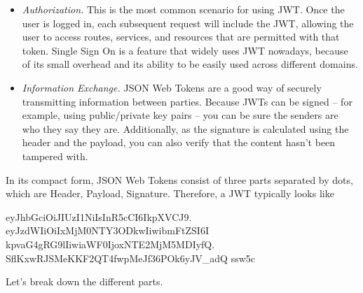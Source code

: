 \begin{itemize}
    \item \textit{Authorization.} This is the most common scenario for using JWT. Once the user is logged in, each
    subsequent request will include the JWT, allowing the user to access routes, services, and resources that are permitted
    with that token.
    Single Sign On is a feature that widely uses JWT nowadays, because of its small overhead and its ability to be easily
    used across different domains.
    \item \textit{Information Exchange.} JSON Web Tokens are a good way of securely transmitting information between
    parties.
    Because JWTs can be signed -- for example, using public/private key pairs -- you can be sure the senders are who they
    say they are.
    Additionally, as the signature is calculated using the header and the payload, you can also verify that the content
    hasn't been tampered with.
\end{itemize}
In its compact form, JSON Web Tokens consist of three parts separated by dots, which are Header, Payload, Signature.
Therefore, a JWT typically looks like
\begin{center}
    \begin{spverbatim}
        eyJhbGciOiJIUzI1NiIsInR5cCI6IkpXVCJ9.
        eyJzdWIiOiIxMjM0NTY3ODkwIiwibmFtZSI6I
        kpvaG4gRG9lIiwiaWF0IjoxNTE2MjM5MDIyfQ.
        SflKxwRJSMeKKF2QT4fwpMeJf36POk6yJV_adQ
        ssw5c
    \end{spverbatim}
\end{center}
Let's break down the different parts.

